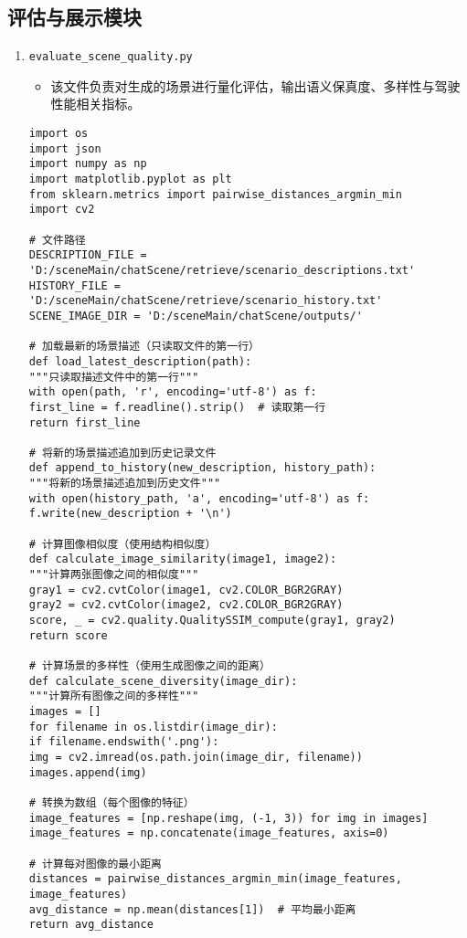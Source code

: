 \subsection*{评估与展示模块}
\begin{enumerate}
	\item \texttt{evaluate\_scene\_quality.py}
	\begin{itemize}
		\item 该文件负责对生成的场景进行量化评估，输出语义保真度、多样性与驾驶性能相关指标。
	\end{itemize}
	\begin{verbatim}
import os
import json
import numpy as np
import matplotlib.pyplot as plt
from sklearn.metrics import pairwise_distances_argmin_min
import cv2

# 文件路径
DESCRIPTION_FILE = 'D:/sceneMain/chatScene/retrieve/scenario_descriptions.txt'
HISTORY_FILE = 'D:/sceneMain/chatScene/retrieve/scenario_history.txt'
SCENE_IMAGE_DIR = 'D:/sceneMain/chatScene/outputs/'

# 加载最新的场景描述（只读取文件的第一行）
def load_latest_description(path):
"""只读取描述文件中的第一行"""
with open(path, 'r', encoding='utf-8') as f:
first_line = f.readline().strip()  # 读取第一行
return first_line

# 将新的场景描述追加到历史记录文件
def append_to_history(new_description, history_path):
"""将新的场景描述追加到历史文件"""
with open(history_path, 'a', encoding='utf-8') as f:
f.write(new_description + '\n')

# 计算图像相似度（使用结构相似度）
def calculate_image_similarity(image1, image2):
"""计算两张图像之间的相似度"""
gray1 = cv2.cvtColor(image1, cv2.COLOR_BGR2GRAY)
gray2 = cv2.cvtColor(image2, cv2.COLOR_BGR2GRAY)
score, _ = cv2.quality.QualitySSIM_compute(gray1, gray2)
return score

# 计算场景的多样性（使用生成图像之间的距离）
def calculate_scene_diversity(image_dir):
"""计算所有图像之间的多样性"""
images = []
for filename in os.listdir(image_dir):
if filename.endswith('.png'):
img = cv2.imread(os.path.join(image_dir, filename))
images.append(img)

# 转换为数组（每个图像的特征）
image_features = [np.reshape(img, (-1, 3)) for img in images]
image_features = np.concatenate(image_features, axis=0)

# 计算每对图像的最小距离
distances = pairwise_distances_argmin_min(image_features, image_features)
avg_distance = np.mean(distances[1])  # 平均最小距离
return avg_distance


\end{verbatim}
\end{enumerate}
